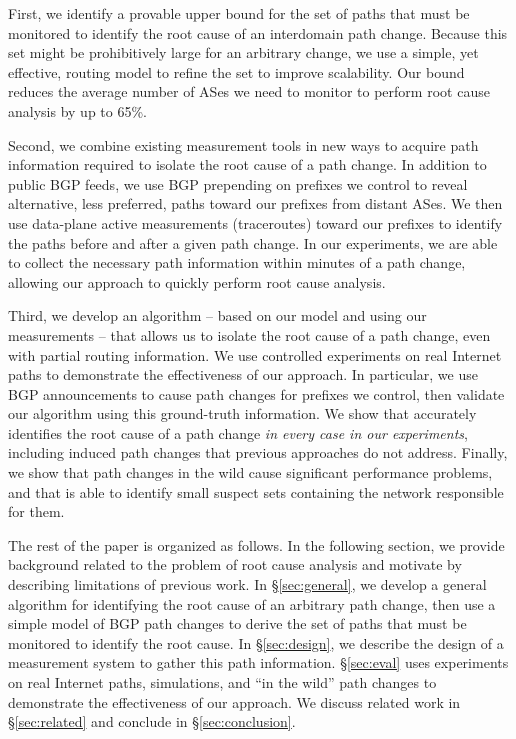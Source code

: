 First, we identify a provable upper bound for 
the set of paths that must be monitored to identify the root cause of an interdomain path change. 
Because this set might be prohibitively large for an arbitrary change, we use a simple, yet 
effective, routing model to refine the set to improve scalability.
Our bound reduces the average number of ASes we need to monitor to
perform root cause analysis by up to 65\%. 

Second, we combine existing measurement tools in new 
ways to acquire path information required to isolate the root cause of a path change. In addition to 
public BGP feeds, we use BGP prepending on prefixes we control to reveal alternative, less preferred, 
paths toward our prefixes from distant ASes. We then use data-plane active measurements 
(traceroutes) toward our prefixes to identify the paths before 
and after a given path change. In our experiments, we are able to collect the necessary path information 
within minutes of a path change, allowing our approach to quickly perform root cause analysis.

Third, we develop an algorithm -- based on our model and using our measurements -- that allows us 
to isolate the root cause of a path change, even with partial routing information. We use 
controlled experiments on real Internet paths to demonstrate the effectiveness of our approach. In 
particular, we use BGP announcements to cause path changes for prefixes we control, then validate 
our algorithm using this ground-truth information. We show that \ouralgo accurately identifies the root cause of a path change \emph{in every 
case in our experiments}, including induced path changes that previous approaches do not address.
Finally, we show that path changes in the wild cause significant performance 
problems, and that \ouralgo is able to identify small suspect sets containing the network responsible for them.

The rest of 
the paper is organized as follows. In the following section, we provide background related to the 
problem of root cause analysis and motivate \ouralgo by describing limitations of previous work. 
In \S\ref{sec:general}, we develop a general algorithm for identifying the root cause of an 
arbitrary path change, then use a simple model of BGP path changes to derive the set of paths 
that must be monitored to identify the root cause. In \S\ref{sec:design}, we describe the design 
of a measurement system to gather this path information. \S\ref{sec:eval} uses experiments on 
real Internet paths, simulations, and ``in the wild'' path changes to demonstrate 
the effectiveness of our approach. We discuss related work in \S\ref{sec:related} and conclude 
in \S\ref{sec:conclusion}.
